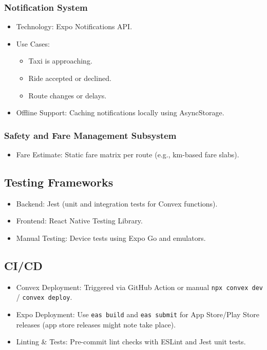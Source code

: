 \documentclass[a4paper,12pt]{article}
\begin{document}
\subsubsection*{Notification System}
\begin{itemize}
    \item Technology: Expo Notifications API.
    \item Use Cases:
    \begin{itemize}
        \item Taxi is approaching.
        \item Ride accepted or declined.
        \item Route changes or delays.
    \end{itemize}
    \item Offline Support: Caching notifications locally using AsyncStorage.
\end{itemize}

\subsubsection*{Safety and Fare Management Subsystem}
\begin{itemize}
    \item Fare Estimate: Static fare matrix per route (e.g., km-based fare slabs).
\end{itemize}

\subsection{Testing Frameworks}
\begin{itemize}
    \item Backend: Jest (unit and integration tests for Convex functions).
    \item Frontend: React Native Testing Library.
    \item Manual Testing: Device tests using Expo Go and emulators.
\end{itemize}

\subsection{CI/CD}
\begin{itemize}
    \item Convex Deployment: Triggered via GitHub Action or manual \texttt{npx convex dev} / \texttt{convex deploy}.
    \item Expo Deployment: Use \texttt{eas build} and \texttt{eas submit} for App Store/Play Store releases (app store releases might note take place).
    \item Linting \& Tests: Pre-commit lint checks with ESLint and Jest unit tests.
\end{itemize}
\end{document}
